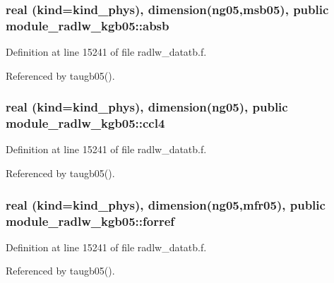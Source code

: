 \subsubsection[{\texorpdfstring{absb}{absb}}]{\setlength{\rightskip}{0pt plus 5cm}real (kind=kind\+\_\+phys), dimension(ng05,{\bf msb05}), public module\+\_\+radlw\+\_\+kgb05\+::absb}\hypertarget{namespacemodule__radlw__kgb05_aebc667b0569824bba455e822eaea6112}{}\label{namespacemodule__radlw__kgb05_aebc667b0569824bba455e822eaea6112}


Definition at line 15241 of file radlw\+\_\+datatb.\+f.



Referenced by taugb05().

\subsubsection[{\texorpdfstring{ccl4}{ccl4}}]{\setlength{\rightskip}{0pt plus 5cm}real (kind=kind\+\_\+phys), dimension(ng05), public module\+\_\+radlw\+\_\+kgb05\+::ccl4}\hypertarget{namespacemodule__radlw__kgb05_a15c6b3bfa9d8cbf20099dd4f364444b5}{}\label{namespacemodule__radlw__kgb05_a15c6b3bfa9d8cbf20099dd4f364444b5}


Definition at line 15241 of file radlw\+\_\+datatb.\+f.



Referenced by taugb05().

\subsubsection[{\texorpdfstring{forref}{forref}}]{\setlength{\rightskip}{0pt plus 5cm}real (kind=kind\+\_\+phys), dimension(ng05,{\bf mfr05}), public module\+\_\+radlw\+\_\+kgb05\+::forref}\hypertarget{namespacemodule__radlw__kgb05_a6ff0c311db14b41c9bdf1170164adc3a}{}\label{namespacemodule__radlw__kgb05_a6ff0c311db14b41c9bdf1170164adc3a}


Definition at line 15241 of file radlw\+\_\+datatb.\+f.



Referenced by taugb05().

